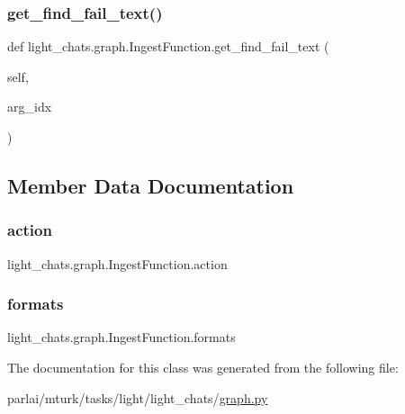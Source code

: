 \subsubsection{\texorpdfstring{get\+\_\+find\+\_\+fail\+\_\+text()}{get\_find\_fail\_text()}}
{\footnotesize\ttfamily def light\+\_\+chats.\+graph.\+Ingest\+Function.\+get\+\_\+find\+\_\+fail\+\_\+text (\begin{DoxyParamCaption}\item[{}]{self,  }\item[{}]{arg\+\_\+idx }\end{DoxyParamCaption})}



\subsection{Member Data Documentation}
\mbox{\label{classlight__chats_1_1graph_1_1IngestFunction_a622f30ce7ef9f3c210c1881eab7c2744}} 
\subsubsection{\texorpdfstring{action}{action}}
{\footnotesize\ttfamily light\+\_\+chats.\+graph.\+Ingest\+Function.\+action}

\mbox{\label{classlight__chats_1_1graph_1_1IngestFunction_af639522820335d377bf31825afe21584}} 
\subsubsection{\texorpdfstring{formats}{formats}}
{\footnotesize\ttfamily light\+\_\+chats.\+graph.\+Ingest\+Function.\+formats}



The documentation for this class was generated from the following file\+:\begin{DoxyCompactItemize}
\item 
parlai/mturk/tasks/light/light\+\_\+chats/\hyperlink{parlai_2mturk_2tasks_2light_2light__chats_2graph_8py}{graph.\+py}\end{DoxyCompactItemize}
